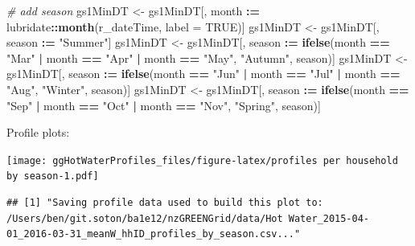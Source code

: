 \documentclass[]{article}
\newenvironment{Shaded}{\begin{snugshade}}{\end{snugshade}}
\newcommand{\KeywordTok}[1]{\textcolor[rgb]{0.13,0.29,0.53}{\textbf{#1}}}
\newcommand{\DataTypeTok}[1]{\textcolor[rgb]{0.13,0.29,0.53}{#1}}
\newcommand{\StringTok}[1]{\textcolor[rgb]{0.31,0.60,0.02}{#1}}
\newcommand{\CommentTok}[1]{\textcolor[rgb]{0.56,0.35,0.01}{\textit{#1}}}
\newcommand{\OtherTok}[1]{\textcolor[rgb]{0.56,0.35,0.01}{#1}}
\newcommand{\OperatorTok}[1]{\textcolor[rgb]{0.81,0.36,0.00}{\textbf{#1}}}
\newcommand{\ErrorTok}[1]{\textcolor[rgb]{0.64,0.00,0.00}{\textbf{#1}}}
\newcommand{\NormalTok}[1]{#1}
\begin{document}
\begin{Shaded}
\begin{Highlighting}[]
\CommentTok{# add season}
\NormalTok{gs1MinDT <-}\StringTok{ }\NormalTok{gs1MinDT[, month }\OperatorTok{:}\ErrorTok{=}\StringTok{ }\NormalTok{lubridate}\OperatorTok{::}\KeywordTok{month}\NormalTok{(r_dateTime, }\DataTypeTok{label =} \OtherTok{TRUE}\NormalTok{)]}
\NormalTok{gs1MinDT <-}\StringTok{ }\NormalTok{gs1MinDT[, season }\OperatorTok{:}\ErrorTok{=}\StringTok{ "Summer"}\NormalTok{]}
\NormalTok{gs1MinDT <-}\StringTok{ }\NormalTok{gs1MinDT[, season }\OperatorTok{:}\ErrorTok{=}\StringTok{ }\KeywordTok{ifelse}\NormalTok{(month }\OperatorTok{==}\StringTok{ "Mar"} \OperatorTok{|}
\StringTok{                                              }\NormalTok{month }\OperatorTok{==}\StringTok{ "Apr"} \OperatorTok{|}
\StringTok{                                              }\NormalTok{month }\OperatorTok{==}\StringTok{ "May"}\NormalTok{, }\StringTok{"Autumn"}\NormalTok{, season)]}
\NormalTok{gs1MinDT <-}\StringTok{ }\NormalTok{gs1MinDT[, season }\OperatorTok{:}\ErrorTok{=}\StringTok{ }\KeywordTok{ifelse}\NormalTok{(month }\OperatorTok{==}\StringTok{ "Jun"} \OperatorTok{|}
\StringTok{                                              }\NormalTok{month }\OperatorTok{==}\StringTok{ "Jul"} \OperatorTok{|}
\StringTok{                                              }\NormalTok{month }\OperatorTok{==}\StringTok{ "Aug"}\NormalTok{, }\StringTok{"Winter"}\NormalTok{, season)]}
\NormalTok{gs1MinDT <-}\StringTok{ }\NormalTok{gs1MinDT[, season }\OperatorTok{:}\ErrorTok{=}\StringTok{ }\KeywordTok{ifelse}\NormalTok{(month }\OperatorTok{==}\StringTok{ "Sep"} \OperatorTok{|}
\StringTok{                                              }\NormalTok{month }\OperatorTok{==}\StringTok{ "Oct"} \OperatorTok{|}
\StringTok{                                              }\NormalTok{month }\OperatorTok{==}\StringTok{ "Nov"}\NormalTok{, }\StringTok{"Spring"}\NormalTok{, season)]}
\end{Highlighting}
\end{Shaded}

Profile plots:

\texttt{[image: ggHotWaterProfiles\_files/figure-latex/profiles per household by season-1.pdf]}

\begin{verbatim}
## [1] "Saving profile data used to build this plot to: /Users/ben/git.soton/ba1e12/nzGREENGrid/data/Hot Water_2015-04-01_2016-03-31_meanW_hhID_profiles_by_season.csv..."
\end{verbatim}
\end{document}

